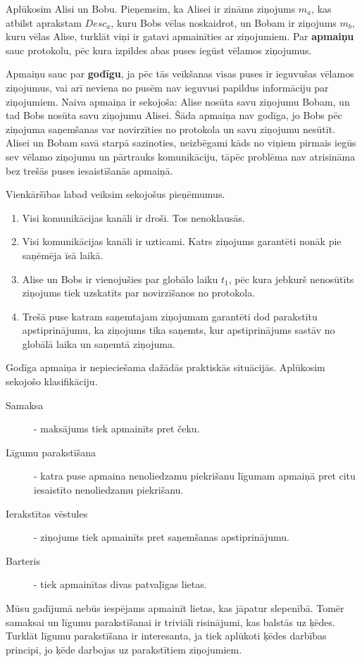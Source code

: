 Aplūkosim Alisi un Bobu. Pieņemsim, ka Alisei ir zināms ziņojums $m_a$, kas atbilst aprakstam $Desc_a$, kuru Bobs vēlas noskaidrot, un Bobam ir ziņojums $m_b$, kuru vēlas Alise, turklāt viņi ir gatavi apmainīties ar ziņojumiem.
 Par \textbf{apmaiņu} sauc protokolu, pēc kura izpildes abas puses iegūst vēlamos ziņojumus. 

Apmaiņu sauc par \textbf{godīgu}, ja pēc tās veikšanas visas puses ir ieguvušas vēlamos ziņojumus, vai arī neviena no pusēm nav ieguvusi papildus informāciju par ziņojumiem. Naiva apmaiņa ir sekojoša: Alise nosūta savu ziņojumu Bobam, un tad Bobs nosūta savu ziņojumu Alisei. Šāda apmaiņa nav godīga, jo Bobs pēc ziņojuma saņemšanas var novirzīties no protokola un savu ziņojumu nesūtīt. Alisei un Bobam savā starpā sazinoties, neizbēgami kāds no viņiem pirmais iegūs sev vēlamo ziņojumu un pārtrauks komunikāciju, tāpēc problēma nav atrisināma bez trešās puses iesaistīšanās apmaiņā.\cite{pagnia99}

Vienkāršības labad veiksim sekojošus pieņēmumus.
\begin{enumerate}
    \item Visi komunikācijas kanāli ir droši. Tos nenoklausās.
    \item Visi komunikācijas kanāli ir uzticami. Katrs ziņojums garantēti nonāk pie saņēmēja īsā laikā.
    \item Alise un Bobs ir vienojušies par globālo laiku $t_1$, pēc kura jebkurš nenosūtīts ziņojums tiek uzskatīts par novirzīšanos no protokola.
    \item Trešā puse katram saņemtajam ziņojumam garantēti dod parakstītu apstiprinājumu, ka ziņojums tika saņemts, kur apstiprinājums sastāv no globālā laika un saņemtā ziņojuma.
\end{enumerate}

Godīga apmaiņa ir nepieciešama dažādās praktiskās situācijās. Aplūkosim sekojošo klasifikāciju.\cite[p.~8]{asokan98}
\begin{description}
    \item[Samaksa] - maksājums tiek apmainīts pret čeku.
    \item[Līgumu parakstīšana] - katra puse apmaina nenoliedzamu piekrišanu līgumam apmaiņā pret citu iesaistīto nenoliedzamu piekrišanu.
    \item[Ierakstītas vēstules] - ziņojums tiek apmainīts pret saņemšanas apstiprinājumu.
    \item[Barteris] - tiek apmainītas divas patvaļīgas lietas.
\end{description}
Mūsu gadījumā nebūs iespējams apmainīt lietas, kas jāpatur slepenībā. Tomēr samaksai un līgumu parakstīšanai ir triviāli risinājumi, kas balstās uz ķēdes. Turklāt līgumu parakstīšana ir interesanta, ja tiek aplūkoti ķēdes darbības principi, jo ķēde darbojas uz parakstītiem ziņojumiem.

